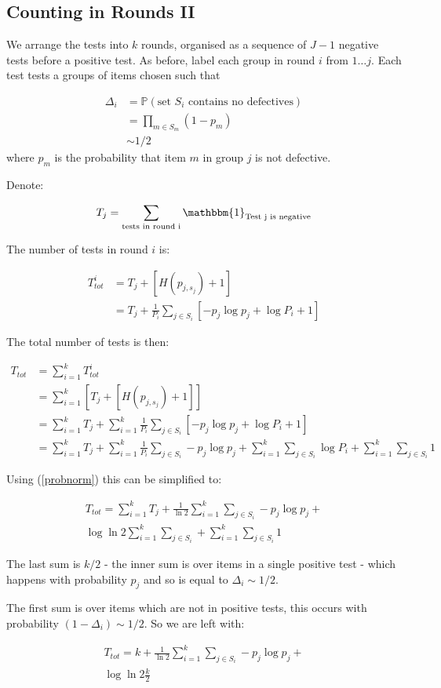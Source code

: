 \documentclass[11pt]{article}
\newcommand{\Prob}[1]
{\mathbb{P}\left( #1 \right)}
\theoremstyle{plain}
\begin{document}
\subsection{Counting in Rounds II}
We arrange the tests into \(k\) rounds, organised as a sequence of \(J-1\) negative tests before a positive test. As before, label each group in round \(i\) from \(1\ldots j\). Each test tests a groups of items chosen such that

\begin{align}
\Delta_i &= \Prob{\text{set \(S_i\) contains no defectives}}\\
 &= \prod_{m\in S_m}\left(1-p_m\right) \\
 &\sim 1/2
\end{align}
where \(p_m\) is the probability that item \(m\) in group \(j\) is not defective.

Denote:

\begin{equation}
T_j = \sum_{\text{tests in round i}} \mathbbm{1}_{\text{Test j is negative}}
\end{equation}

The number of tests in round \(i\) is:

\begin{align}
T_{tot}^i &= T_j + \left[H\left(p_{j,s_j}\right) + 1\right] \\
&= T_j+ \frac{1}{P_i}\sum_{j\in S_i}\left[ -p_{j}\log{p_j} + \log{P_i} + 1\right]
\end{align}

The total number of tests is then:

\begin{align}
T_{tot} &= \sum	_{i=1}^k T_{tot}^i \\ 
&= \sum_{i=1}^k\left[ T_j + \left[H\left(p_{j,s_j}\right) + 1\right]\right] \\
&= \sum_{i=1}^k T_j + \sum_{i=1}^k\frac{1}{P_i}\sum_{j\in S_i}\left[ -p_{j}\log{p_j} + \log{P_i} + 1\right] \\
&= \sum_{i=1}^k T_j + \sum_{i=1}^k\frac{1}{P_i}\sum_{j\in S_i}-p_{j}\log{p_j} + \sum_{i=1}^k \sum_{j\in S_i} \log{P_i} + \sum_{i=1}^k \sum_{j\in S_i} 1
\end{align}

Using (\ref{probnorm}) this can be simplified to:

\begin{align}
T_{tot} = \sum_{i=1}^k T_j + \frac{1}{\ln{2}}\sum_{i=1}^k\sum_{j\in S_i}-p_{j}\log{p_j} + \\ \log{\ln{2}} \sum_{i=1}^k \sum_{j\in S_i}  + \sum_{i=1}^k \sum_{j\in S_i} 1
\end{align}

The last sum is \(k/2\) - the inner sum is over items in a single positive test - which happens with probability \(p_j\) and so is equal to \(\Delta_i \sim 1/2\).

The first sum is over items which are not in positive tests, this occurs with probability \(\left(1-\Delta_i\right) \sim 1/2\). So we are left with:

\begin{align}
T_{tot} = k + \frac{1}{\ln{2}}\sum_{i=1}^k\sum_{j\in S_i}-p_{j}\log{p_j} + \\ \log{\ln{2}}\frac{k}{2}
\end{align}
\end{document}
